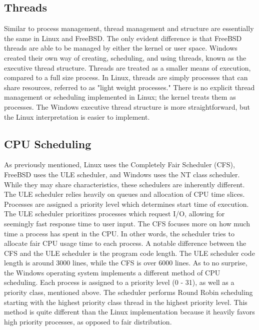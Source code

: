\documentclass[10pt, onecolumn]{IEEEtran}
\begin{document}
    \subsection*{Threads}
        Similar to process management, thread management and structure are essentially the same in Linux and FreeBSD. The only evident difference is that FreeBSD threads are able to be managed by either the kernel or user space. Windows created their own way of creating, scheduling, and using threads, known as the executive thread structure. Threads are treated as a smaller means of execution, compared to a full size process. In Linux, threads are simply processes that can share resources, referred to as "light weight processes." There is no explicit thread management or scheduling implemented in Linux; the kernel treats them as processes. The Windows executive thread structure is more straightforward, but the Linux interpretation is easier to implement.
    
    \vspace{3mm}
    
    \subsection*{CPU Scheduling}
        As previously mentioned, Linux uses the Completely Fair Scheduler (CFS), FreeBSD uses the ULE scheduler, and Windows uses the NT class scheduler. While they may share characteristics, these schedulers are inherently different. The ULE scheduler relies heavily on queues and allocation of CPU time slices. Processes are assigned a priority level which determines start time of execution. The ULE scheduler prioritizes processes which request I/O, allowing for seemingly fast response time to user input. The CFS focuses more on how much time a process has spent in the CPU. In other words, the scheduler tries to allocate fair CPU usage time to each process. A notable difference between the CFS and the ULE scheduler is the program code length. The ULE scheduler code length is around 3000 lines, while the CFS is over 6000 lines.
        As to no surprise, the Windows operating system implements a different method of CPU scheduling. Each process is assigned to a priority level (0 - 31), as well as a priority class, mentioned above. The scheduler performs Round Robin scheduling starting with the highest priority class thread in the highest priority level. This method is quite different than the Linux implementation because it heavily favors high priority processes, as opposed to fair distribution.
\end{document}
